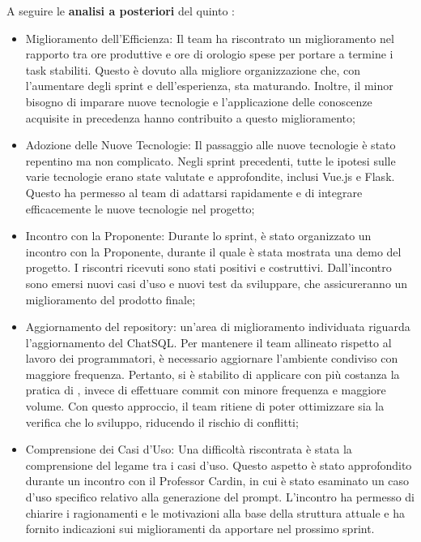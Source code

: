 \vspace{0.5\baselineskip}
\par A seguire le \textbf{analisi a posteriori} del quinto :
\begin{itemize}
  \item Miglioramento dell'Efficienza: Il team ha riscontrato un miglioramento nel rapporto tra ore produttive e ore di orologio spese per portare a termine i task stabiliti. Questo è dovuto alla migliore organizzazione che, con l'aumentare degli sprint e dell'esperienza, sta maturando. Inoltre, il minor bisogno di imparare nuove tecnologie e l'applicazione delle conoscenze acquisite in precedenza hanno contribuito a questo miglioramento;
  \item Adozione delle Nuove Tecnologie: Il passaggio alle nuove tecnologie è stato repentino ma non complicato. Negli sprint precedenti, tutte le ipotesi sulle varie tecnologie erano state valutate e approfondite, inclusi Vue.js e Flask. Questo ha permesso al team di adattarsi rapidamente e di integrare efficacemente le nuove tecnologie nel progetto;
  \item Incontro con la Proponente: Durante lo sprint, è stato organizzato un incontro con la Proponente, durante il quale è stata mostrata una demo del progetto. I riscontri ricevuti sono stati positivi e costruttivi. Dall'incontro sono emersi nuovi casi d'uso e nuovi test da sviluppare, che assicureranno un miglioramento del prodotto finale;
  \item Aggiornamento del repository: un'area di miglioramento individuata riguarda l'aggiornamento del  ChatSQL. Per mantenere il team allineato rispetto al lavoro dei programmatori, è necessario aggiornare l'ambiente condiviso con maggiore frequenza. Pertanto, si è stabilito di applicare con più costanza la pratica di , invece di effettuare commit con minore frequenza e maggiore volume. Con questo approccio, il team ritiene di poter ottimizzare sia la verifica che lo sviluppo, riducendo il rischio di conflitti;
  \item Comprensione dei Casi d'Uso: Una difficoltà riscontrata è stata la comprensione del legame tra i casi d'uso. Questo aspetto è stato approfondito durante un incontro con il Professor Cardin, in cui è stato esaminato un caso d'uso specifico relativo alla generazione del prompt. L'incontro ha permesso di chiarire i ragionamenti e le motivazioni alla base della struttura attuale e ha fornito indicazioni sui miglioramenti da apportare nel prossimo sprint.
\end{itemize}

